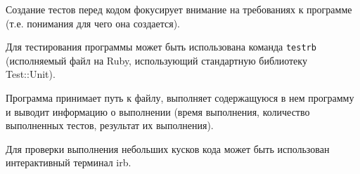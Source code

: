 Создание тестов перед кодом фокусирует внимание на требованиях к программе (т.е. понимания для чего она создается).

Для тестирования программы может быть использована команда \verb!testrb! (исполняемый файл на Ruby, использующий стандартную библиотеку Test::Unit). 

Программа принимает путь к файлу, выполняет содержащуюся в нем программу и выводит информацию о выполнении (время выполнения, количество выполненных тестов, результат их выполнения). 

Для проверки выполнения небольших кусков кода может быть использован интерактивный терминал irb. 